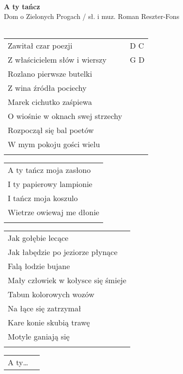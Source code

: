 \documentclass[a5paper]{article}
\begin{document}


\noindent
\fontsize{12pt}{15pt}\selectfont
\textbf{A ty tańcz} \\
\fontsize{8pt}{10pt}\selectfont
Dom o Zielonych Progach / sł. i muz. Roman Reszter-Fons \\ \\
\fontsize{10pt}{12pt}\selectfont
{}
\begin{tabular}{@{}p{8.5cm}p{3cm}@{}}
\noindent
Zawitał czar poezji & D C \\
Z właścicielem słów i wierszy & G D \\
Rozlano pierwsze butelki & \\
Z wina źródła pociechy & \\
Marek cichutko zaśpiewa & \\
O wiośnie w oknach swej strzechy & \\
Rozpoczął się bal poetów & \\
W mym pokoju gości wielu & \\ \\
\end{tabular}

\noindent
\begin{tabular}{@{}p{8.5cm}@{}}
A ty tańcz moja zasłono \\
I ty papierowy lampionie \\
I tańcz moja koszulo \\
Wietrze owiewaj me dłonie \\ \\
\end{tabular}

\noindent
\begin{tabular}{@{}p{9.5cm}@{}}
Jak gołębie lecące \\
Jak łabędzie po jeziorze płynące \\
Falą łodzie bujane \\
Mały człowiek w kołysce się śmieje \\
Tabun kolorowych wozów \\
Na łące się zatrzymał \\
Kare konie skubią trawę \\
Motyle ganiają się \\ \\
\end{tabular}

\noindent
\begin{tabular}{@{}p{8.5cm}p{3cm}@{}}
A ty…
\end{tabular}
\end{document}
